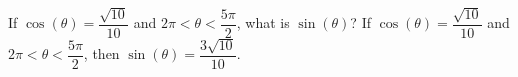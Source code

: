 {If $\cos(\theta) = \dfrac{\sqrt{10}}{10}$ and $2\pi < \theta < \dfrac{5\pi}{2}$, what is $\sin(\theta)$?}
{If $\cos(\theta) = \dfrac{\sqrt{10}}{10}$ and $2\pi < \theta < \dfrac{5\pi}{2}$, then $\sin(\theta)  = \dfrac{3 \sqrt{10}}{10}$.}
